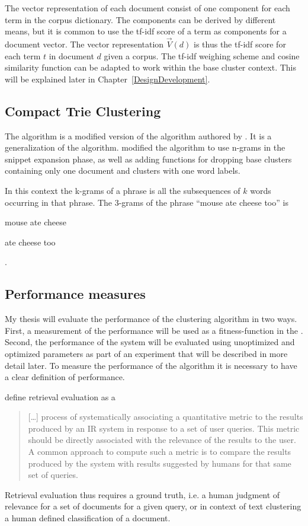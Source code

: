 The vector representation of each document consist of one component for each term in the corpus dictionary. The components can be derived by different means, but it is common to use the tf-idf score of a term as components for a document vector. The vector representation \(\vec{V}(d)\) is thus the tf-idf score for each term \(t\) in document \(d\) given a corpus. The tf-idf weighing scheme and cosine similarity function can be adapted to work within the base cluster context. This will be explained later in Chapter~\ref{DesignDevelopment}.

\subsection{Compact Trie Clustering}
The \CTC algorithm is a modified version of the \STC algorithm authored by \cite{Moe2013}. It is a generalization of the \STC algorithm. \cite{Moe2013} modified the algorithm to use n-grams in the snippet expansion phase, as well as adding functions for dropping base clusters containing only one document and clusters with one word labels.

 In this context the k-grams of a phrase is all the subsequences of \(k\) words occurring in that phrase. The 3-grams of the phrase ``mouse ate cheese too'' is
\begin{inparaenum}[(1)] 
    \item mouse ate cheese
    \item ate cheese too
\end{inparaenum}.

\subsection{Performance measures}
My thesis will evaluate the performance of the clustering algorithm in two ways. First, a measurement of the performance will be used as a fitness-function in the \GA. Second, the performance of the system will be evaluated using unoptimized and optimized parameters as part of an experiment that will be described in more detail later. To measure the performance of the \CTC algorithm it is necessary to have a clear definition of performance.

\cite[][131]{Baeza-Yates2011b} define retrieval evaluation as a \begin{quote} 
[\dots] process of systematically associating a quantitative metric to the results produced by an IR system in response to a set of user queries. This metric should be directly associated with the relevance of the results to the user. A common approach to compute such a metric is to compare the results produced by the system with results suggested by humans for that same set of queries.
\end{quote}
Retrieval evaluation thus requires a ground truth, i.e. a human judgment of relevance for a set of documents for a given query, or in context of text clustering a human defined classification of a document.

